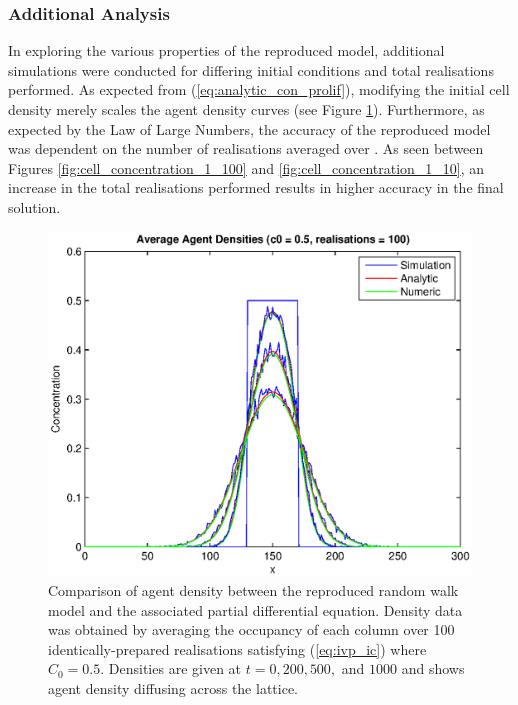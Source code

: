 \documentclass[11pt,a4paper]{article}
\begin{document}
		\subsubsection{Additional Analysis}
			\label{subs:additionalanalysis}
			
			In exploring the various properties of the reproduced model, additional simulations were conducted for differing initial conditions and total realisations performed. As expected from (\ref{eq:analytic_con_prolif}), modifying the initial cell density merely scales the agent density curves (see Figure \ref{fig:cell_concentration_5_100}). Furthermore, as expected by the Law of Large Numbers, the accuracy of the reproduced model was dependent on the number of realisations averaged over \cite{lawlargenum}. As seen between Figures \ref{fig:cell_concentration_1_100} and \ref{fig:cell_concentration_1_10}, an increase in the total realisations performed results in higher accuracy in the final solution.
		
			\begin{figure}[tbh]
				\centering
					\includegraphics[width=\textwidth]{./Figures/cell_concentration_5_100.eps}
				\caption{Comparison of agent density between the reproduced random walk model and the associated partial differential equation. Density data was obtained by averaging the occupancy of each column over 100 identically-prepared realisations satisfying (\ref{eq:ivp_ic}) where $C_0 = 0.5$. Densities are given at $t = 0, 200, 500,$ and $1000$ and shows agent density diffusing across the lattice.}
				\label{fig:cell_concentration_5_100}
			\end{figure}
\end{document}
